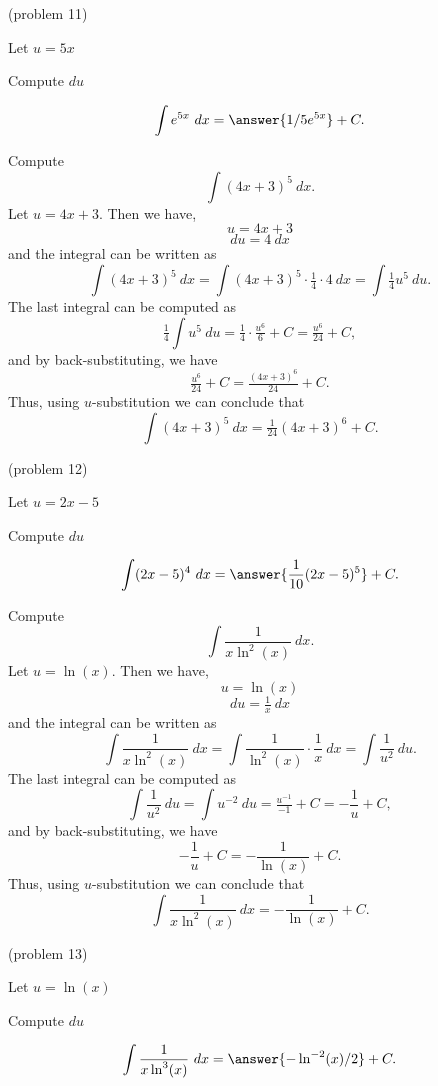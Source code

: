 \documentclass{ximera}
\begin{document}
\begin{problem}(problem 11)
\begin{hint}
Let $u = 5x$
\end{hint}
\begin{hint}
Compute $du$
\end{hint}
\[\int e^{5x} \ dx = \answer{1/5 e^{5x}} +C.\]
\end{problem}


\begin{example}[example 12] Compute 
\[\int (4x+3)^5 \ dx.\]
Let $u = 4x+3$. Then we have,
\[u = 4x+3\]
\[du = 4 \ dx\]
and the integral can be written as 
\[\int (4x+3)^5 \ dx =   \int (4x+3)^5 \cdot \tfrac14\cdot 4  \   dx =   \int \tfrac14 u^5 \ du.\]
The last integral can be computed as 
\[\tfrac14  \int u^5 \ du = \tfrac14  \cdot \tfrac{u^6}{6} + C = \tfrac{u^6}{24} + C,\]
and by back-substituting, we have 
\[\tfrac{u^6}{24} + C = \tfrac{(4x+3)^6}{24}+ C.\]
Thus, using $u$-substitution we can conclude that
\[\int (4x+3)^5 \ dx = \tfrac{1}{24}(4x+3)^6 + C.\]
\end{example}




\begin{problem}(problem 12)
\begin{hint}
Let $u = 2x - 5$
\end{hint}
\begin{hint}
Compute $du$
\end{hint}
\[\int (2x - 5)^4 \ dx = \answer{\frac{1}{10}(2x-5)^5} +C.\]
\end{problem}


\begin{example}[example 13] Compute 
\[\int \frac{1}{x\ln^2(x)} \ dx.\]
Let $u = \ln(x)$. Then we have,
\[u = \ln(x)\]
\[du = \tfrac1x \ dx\]
and the integral can be written as 
\[\int \frac{1}{x\ln^2(x)} \ dx = \int \frac{1}{\ln^2(x)} \cdot \frac{1}{x}\  dx = \int \frac{1}{u^2} \ du.\]
The last integral can be computed as 
\[\int \frac{1}{u^2} \ du = \int u^{-2} \ du = \tfrac{u^{-1}}{-1} + C 
= -\frac{1}{u} + C,\]
and by back-substituting, we have 
\[-\frac{1}{u} + C =  -\frac{1}{\ln(x)} + C.\]
Thus, using $u$-substitution we can conclude that
\[\int \frac{1}{x\ln^2(x)} \ dx =  -\frac{1}{\ln(x)} + C.\]
\end{example}


\begin{problem}(problem 13)
\begin{hint}
Let $u = \ln(x)$
\end{hint}
\begin{hint}
Compute $du$
\end{hint}
\[\int \frac{1}{x\ln^3(x)} \ dx = \answer{- \ln^{-2}(x)/2} +C.\]
\end{problem}
\end{document}
